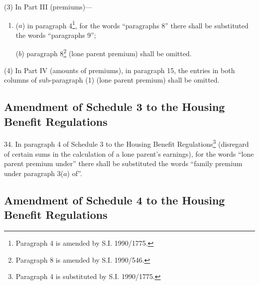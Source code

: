 \documentclass[a4paper]{article}
\begin{document}
(3) In Part III (premiums)—
\begin{enumerate}\item[]
($a$) in paragraph 4\footnote{\frenchspacing Paragraph 4 is amended by S.I. 1990/1775.}, for the words “paragraphs 8” there shall be substituted the words “paragraphs 9”;

($b$) paragraph 8\footnote{\frenchspacing Paragraph 8 is amended by S.I. 1990/546.} (lone parent premium) shall be omitted.
\end{enumerate}

(4) In Part IV (amounts of premiums), in paragraph 15, the entries in both columns of sub-paragraph (1) (lone parent premium) shall be omitted.

\subsection[34. Amendment of Schedule 3 to the Housing Benefit Regulations]{Amendment of Schedule 3 to the Housing Benefit Regulations}

34.  In paragraph 4 of Schedule 3 to the Housing Benefit Regulations\footnote{\frenchspacing Paragraph 4 is substituted by S.I. 1990/1775.} (disregard of certain sums in the calculation of a lone parent’s earnings), for the words “lone parent premium under” there shall be substituted the words “family premium under paragraph 3($a$) of”.

\subsection[35. Amendment of Schedule 4 to the Housing Benefit Regulations]{Amendment of Schedule 4 to the Housing Benefit Regulations}
\end{document}
